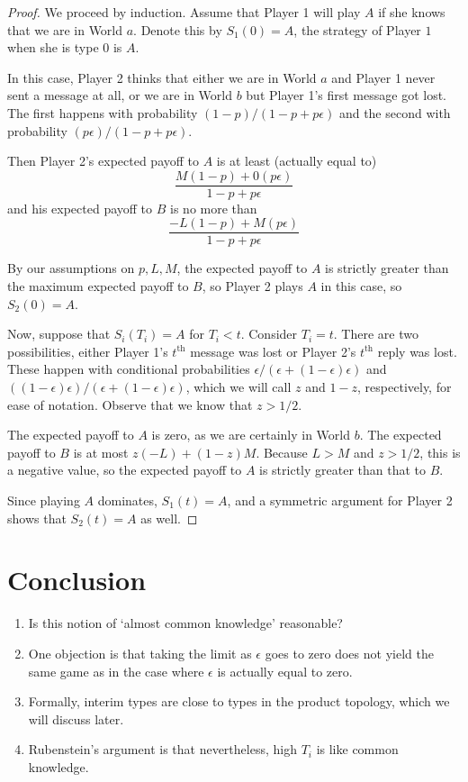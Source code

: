 \begin{proof}
	We proceed by induction.  Assume that Player 1 will play $A$ if she knows that we are in World $a$.  Denote this by $S_1(0)=A$, the strategy of Player $1$ when she is type 0 is $A$.
	
	In this case, Player 2 thinks that either we are in World $a$ and Player 1 never sent a message at all, or we are in World $b$ but Player 1's first message got lost.  The first happens with probability $(1-p)/(1-p+p\epsilon)$ and the second with probability $(p\epsilon)/(1-p+p\epsilon)$.
	
	Then Player 2's expected payoff to $A$ is at least (actually equal to)
	$$\frac{M(1-p)+0(p\epsilon)}{1-p+p\epsilon}$$ and his expected payoff to $B$ is no more than $$\frac{-L(1-p)+M(p\epsilon)}{1-p+p\epsilon}$$
	
	By our assumptions on $p,L,M$, the expected payoff to $A$ is strictly greater than the maximum expected payoff to $B$, so Player 2 plays $A$ in this case, so $S_2(0)=A$.
	
	Now, suppose that $S_i(T_i)=A$ for $T_i<t$.  Consider $T_i=t$.  There are two possibilities, either Player 1's $t^{\text{th}}$ message was lost or Player 2's $t^\text{th}$ reply was lost.  These happen with conditional probabilities $\epsilon/(\epsilon+(1-\epsilon)\epsilon)$ and $((1-\epsilon)\epsilon)/(\epsilon+(1-\epsilon)\epsilon)$, which we will call $z$ and $1-z$, respectively, for ease of notation.  Observe that we know that $z>1/2$.
	
	The expected payoff to $A$ is zero, as we are certainly in World $b$.  The expected payoff to $B$ is at most $z(-L)+(1-z)M$.  Because $L>M$ and $z>1/2$, this is a negative value, so the expected payoff to $A$ is strictly greater than that to $B$.
	
	Since playing $A$ dominates, $S_1(t)=A$, and a symmetric argument for Player 2 shows that $S_2(t)=A$ as well.
\end{proof}

\section*{Conclusion}
\begin{enumerate}
	\item Is this notion of `almost common knowledge' reasonable?
	\item One objection is that taking the limit as $\epsilon$ goes to zero does not yield the same game as in the case where $\epsilon$ is actually equal to zero.
	\item Formally, interim types are close to types in the product topology, which we will discuss later.
	\item Rubenstein's argument is that nevertheless, high $T_i$ is like common knowledge.
\end{enumerate}